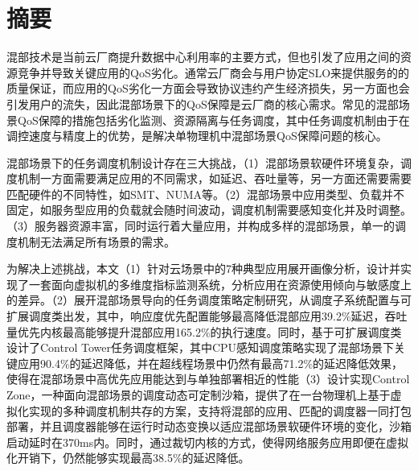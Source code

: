 
\maketitle%
\MAKETITLE%
\makedeclaration%
\intobmk\chapter*{摘\quad 要}%
\setcounter{page}{1}%


混部技术是当前云厂商提升数据中心利用率的主要方式，但也引发了应用之间的资源竞争并导致关键应用的QoS劣化。通常云厂商会与用户协定SLO来提供服务的的质量保证，而应用的QoS劣化一方面会导致协议违约产生经济损失，另一方面也会引发用户的流失，因此混部场景下的QoS保障是云厂商的核心需求。常见的混部场景QoS保障的措施包括劣化监测、资源隔离与任务调度，其中任务调度机制由于在调控速度与精度上的优势，是解决单物理机中混部场景QoS保障问题的核心。

混部场景下的任务调度机制设计存在三大挑战，（1）混部场景软硬件环境复杂，调度机制一方面需要满足应用的不同需求，如延迟、吞吐量等，另一方面还需要需要匹配硬件的不同特性，如SMT、NUMA等。（2）混部场景中应用类型、负载并不固定，如服务型应用的负载就会随时间波动，调度机制需要感知变化并及时调整。（3）服务器资源丰富，同时运行着大量应用，并构成多样的混部场景，单一的调度机制无法满足所有场景的需求。

为解决上述挑战，本文（1）针对云场景中的7种典型应用展开画像分析，设计并实现了一套面向虚拟机的多维度指标监测系统，分析应用在资源使用倾向与敏感度上的差异。（2）展开混部场景导向的任务调度策略定制研究，从调度子系统配置与可扩展调度类出发，其中，响应度优先配置能够最高降低混部应用39.2\%延迟，吞吐量优先内核最高能够提升混部应用165.2\%的执行速度。同时，基于可扩展调度类设计了Control Tower任务调度框架，其中CPU感知调度策略实现了混部场景下关键应用90.4\%的延迟降低，并在超线程场景中仍然有最高71.2\%的延迟降低效果，使得在混部场景中高优先应用能达到与单独部署相近的性能（3）设计实现Control Zone，一种面向混部场景的调度动态可定制沙箱，提供了在一台物理机上基于虚拟化实现的多种调度机制共存的方案，支持将混部的应用、匹配的调度器一同打包部署，并且调度器能够在运行时动态变换以适应混部场景软硬件环境的变化，沙箱启动延时在370ms内。同时，通过裁切内核的方式，使得网络服务应用即便在虚拟化开销下，仍然能够实现最高38.5\%的延迟降低。

